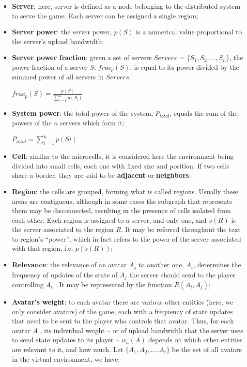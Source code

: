 \begin{itemize}
	\item \textbf{Server}: here, server is defined as a node belonging to the distributed system to serve the game. Each server can be assigned a single region;
	\item \textbf{Server power}: the server power, $p(S)$ is a numerical value proportional to the server's upload bandwidth;
	\item \textbf{Server power fraction}: given a set of servers $Servers$ = $\{S_1, S_2, ..., S_n\}$, the power fraction of a server $S$, $frac_p(S)$, is equal to its power divided by the summed power of all servers in $Servers$:
	
		\begin{center}
			$frac_p(S) = \frac{\displaystyle p(S)}{\displaystyle\sum_{i=1}^{n} p(S_i)}$
		\end{center}
		
	\item \textbf{System power}: the total power of the system, $P_{total}$, equals the sum of the powers of the $n$ servers which form it:
	
		\begin{center}
			$\displaystyle P_{total} = \sum_{i=1}^{n} p(Si)$
		\end{center}
	
	\item \textbf{Cell}: similar to the microcells, it is considered here the environment being divided into small cells, each one with fixed size and position. If two cells share a border, they are said to be \textbf{adjacent} or \textbf{neighbors};
	\item \textbf{Region}: the cells are grouped, forming what is called regions. Usually these areas are contiguous, although in some cases the subgraph that represents them may be disconnected, resulting in the presence of cells isolated from each other. Each region is assigned to a server, and only one, and $s(R)$ is the server associated to the region $R$. It may be referred throughout the text to region's ``power'', which in fact refers to the power of the server associated with that region, i.e. $p(s(R))$;
	\item \textbf{Relevance}: the relevance of an avatar $A_j$ to another one, $A_i$, determines the frequency of updates of the state of $A_j$ the server should send to the player controlling $A_i$ \cite{bezerra2008a3}. It may be represented by the function $R(A_i,A_j)$;
	\item \textbf{Avatar's weight}: to each avatar there are various other entities (here, we only consider avatars) of the game, each with a frequency of state updates that need to be sent to the player who controls that avatar. Thus, for each avatar $A$ , its individual weight -- or of upload bandwidth that the server uses to send state updates to its player -- $w_a(A)$ depends on which other entities are relevant to it, and how much. 
	Let $\{A_1, A_2, ..., A_t\}$ be the set of all avatars in the virtual environment, we have:
	

\end{itemize}
